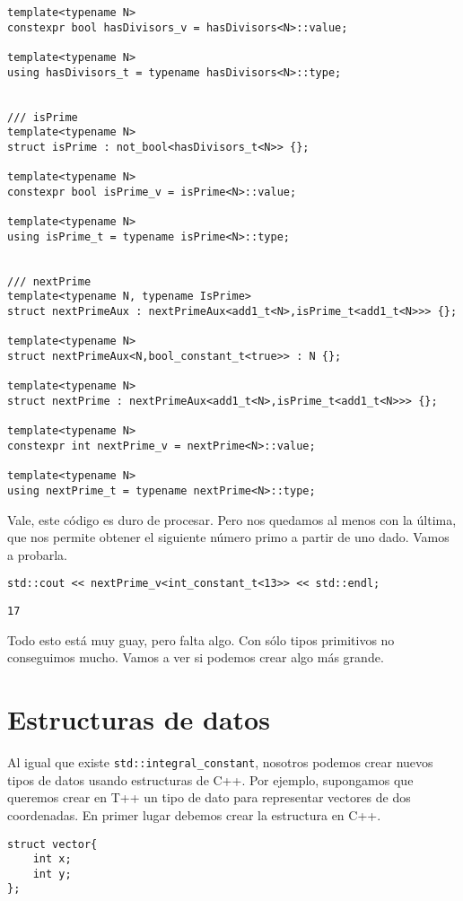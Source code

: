\documentclass[11pt]{article}
\begin{document}
\begin{verbatim}
template<typename N>
constexpr bool hasDivisors_v = hasDivisors<N>::value;

template<typename N>
using hasDivisors_t = typename hasDivisors<N>::type;


/// isPrime
template<typename N>
struct isPrime : not_bool<hasDivisors_t<N>> {};

template<typename N>
constexpr bool isPrime_v = isPrime<N>::value;

template<typename N>
using isPrime_t = typename isPrime<N>::type;


/// nextPrime
template<typename N, typename IsPrime>
struct nextPrimeAux : nextPrimeAux<add1_t<N>,isPrime_t<add1_t<N>>> {};

template<typename N>
struct nextPrimeAux<N,bool_constant_t<true>> : N {};

template<typename N>
struct nextPrime : nextPrimeAux<add1_t<N>,isPrime_t<add1_t<N>>> {};

template<typename N>
constexpr int nextPrime_v = nextPrime<N>::value;

template<typename N>
using nextPrime_t = typename nextPrime<N>::type;
\end{verbatim}

Vale, este código es duro de procesar. Pero nos quedamos al menos con la última, que nos permite obtener el siguiente número primo a partir de uno dado. Vamos a probarla.

\begin{verbatim}
std::cout << nextPrime_v<int_constant_t<13>> << std::endl;
\end{verbatim}

\begin{verbatim}
17
\end{verbatim}


Todo esto está muy guay, pero falta algo. Con sólo tipos primitivos no conseguimos mucho. Vamos a ver si podemos crear algo más grande.

\section{Estructuras de datos}
\label{sec:org367e309}
Al igual que existe \texttt{std::integral\_constant}, nosotros podemos crear nuevos tipos de datos usando estructuras de C++. Por ejemplo, supongamos que queremos crear en T++ un tipo de dato para representar vectores de dos coordenadas. En primer lugar debemos crear la estructura en C++.

\begin{verbatim}
struct vector{
	int x;
	int y;
};
\end{verbatim}
\end{document}
